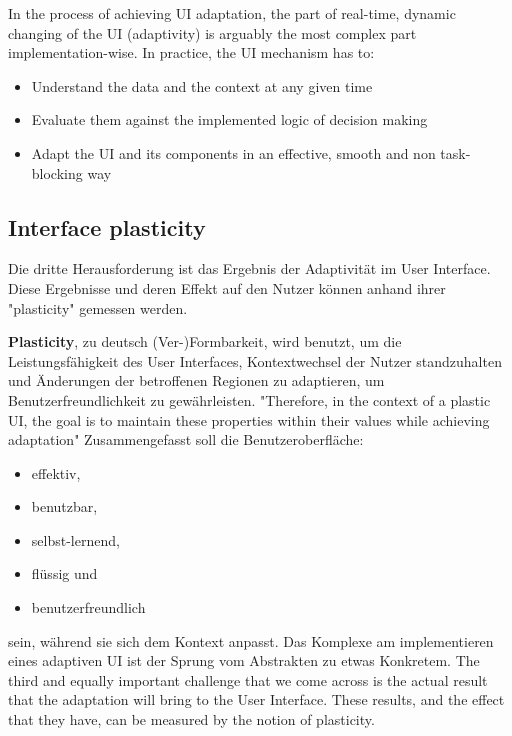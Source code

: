 In the process of achieving UI adaptation, the part of real-time, dynamic changing of the UI (adaptivity) is arguably the
most complex part implementation-wise. In practice, the UI mechanism has to:
\begin{itemize}
    \item Understand the data and the context at any given time
    \item Evaluate them against the implemented logic of decision making
    \item Adapt the UI and its components in an effective, smooth and non task-blocking way
\end{itemize}

\subsection{Interface plasticity} %
Die dritte Herausforderung ist das Ergebnis der Adaptivität im User Interface. Diese Ergebnisse und deren Effekt auf den Nutzer 
können anhand ihrer "plasticity" gemessen werden.

\textbf{Plasticity}, zu deutsch (Ver-)Formbarkeit, wird benutzt, um die Leistungsfähigkeit des User Interfaces, 
Kontextwechsel der Nutzer standzuhalten und Änderungen der betroffenen Regionen zu adaptieren, 
um Benutzerfreundlichkeit zu gewährleisten.
"Therefore, in the context of a plastic UI, the goal is to maintain these properties within their values while achieving adaptation"
Zusammengefasst soll die Benutzeroberfläche:
\begin{itemize}
    \item effektiv,
    \item benutzbar,
    \item selbst-lernend,
    \item flüssig und
    \item benutzerfreundlich
\end{itemize}
sein, während sie sich dem Kontext anpasst. Das Komplexe am implementieren eines adaptiven UI ist der Sprung vom Abstrakten 
zu etwas Konkretem.
The third and equally important challenge that we come across is the actual result that the adaptation will bring to the User Interface.
These results, and the effect that they have, can be measured by the notion of plasticity.

